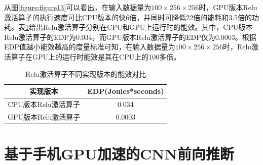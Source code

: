 从图\ref{figure:figure13}可以看出，在输入数据量为$100 \times 256 \times 256 $时，GPU版本Relu激活算子的执行速度可比CPU版本的快6倍，并同时可降低22倍的能耗和3.5倍的功耗。表\ref{table:table4}给出Relu激活算子分别在CPU和GPU上运行时的能效。其中，CPU版本Relu激活算子的EDP为0.034，而GPU版本Relu激活算子的EDP仅为0.0003。根据EDP值越小能效越高的度量标准可知，在输入数据量为$100 \times 256 \times 256 $时，Relu激活算子在GPU上的运行时能效是其在CPU上的100多倍。

\begin{table}[htbp]
  \centering
  \caption{Relu激活算子不同实现版本的能效对比}
  \label{table:table4}
  \begin{tabular}{cc}
    \toprule
      实现版本 & EDP(Joules*seconds) \\
    \midrule
      CPU版本Relu激活算子 & 0.034 \\
      GPU版本Relu激活算子 & 0.0003 \\
    \bottomrule
  \end{tabular}
\end{table}


\section{基于手机GPU加速的CNN前向推断}


